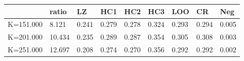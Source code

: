 \begin{table}[ht]
\centering
\begin{tabular}{rllllllll}
  \hline
 & ratio & LZ & HC1 & HC2 & HC3 & LOO & CR & Neg \\ 
  \hline
K=151.000 &  8.121 & 0.241 & 0.279 & 0.278 & 0.324 & 0.293 & 0.294 & 0.005 \\ 
  K=201.000 & 10.434 & 0.235 & 0.289 & 0.287 & 0.354 & 0.305 & 0.308 & 0.003 \\ 
  K=251.000 & 12.697 & 0.208 & 0.274 & 0.270 & 0.356 & 0.292 & 0.292 & 0.002 \\ 
   \hline
\end{tabular}
\end{table}
